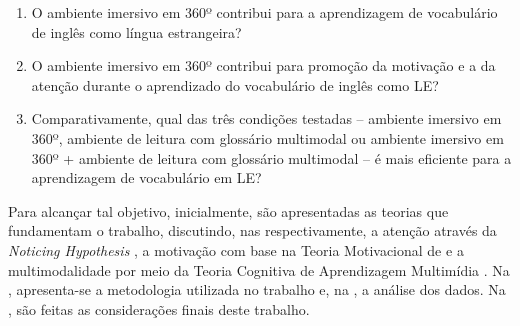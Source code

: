 \begin{enumerate}[label=\arabic{*}.]
  \item O ambiente imersivo em 360º contribui para a aprendizagem de
  vocabulário de inglês como língua estrangeira?
  
  \item  O ambiente imersivo em 360º contribui para promoção da motivação e a
  da atenção durante o aprendizado do vocabulário de inglês como LE?
  
  \item Comparativamente, qual das três condições testadas -- ambiente
  imersivo em 360º, ambiente de leitura com glossário multimodal ou
  ambiente imersivo em 360º + ambiente de leitura com glossário multimodal
  -- é mais eficiente para a aprendizagem de vocabulário em LE?
  
\end{enumerate}

Para alcançar tal objetivo, inicialmente, são apresentadas as teorias
que fundamentam o trabalho, discutindo, nas  %
respectivamente, a atenção através da \emph{Noticing Hypothesis}
\cite{schmidit1990}, a motivação com base na Teoria Motivacional de \textcite{gardner1979,gardner2010} e a multimodalidade por meio da Teoria Cognitiva
de Aprendizagem Multimídia \cite{mayer2001}. Na , apresenta-se a
metodologia utilizada no trabalho e, na , a análise dos dados. Na
, são feitas as considerações finais deste trabalho.
